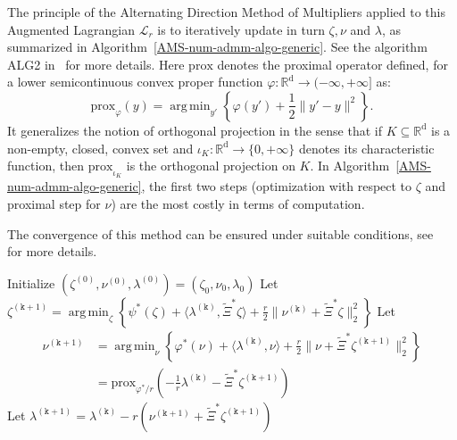 \documentclass{amsproc}
\theoremstyle{definition}
\theoremstyle{remark}
\numberwithin{equation}{section}
\newcommand{\RR}{{\mathbb R}}
\newcommand{\cL}{{\mathcal L}}
\DeclareMathOperator*{\argmin}{arg\,min}
\newcommand{\prox}{\mathrm{prox}}
\begin{document}
The principle of the Alternating Direction Method of Multipliers applied to this Augmented Lagrangian $\cL_r$ is to iteratively update in turn $\zeta, \nu$ and $\lambda$, as summarized in Algorithm~\ref{AMS-num-admm-algo-generic}. See the algorithm ALG2 in~\cite[Chapter 3]{MR724072} for more details. Here $\prox$ denotes the proximal operator defined, for a lower semicontinuous convex proper function $\varphi: \RR^{\mathrm{d}} \to (-\infty, +\infty]$ as:
$$
	\prox_\varphi(y) = \argmin_{y'} \left\{ \varphi(y') + \frac{1}{2} \|y' - y\|^2\right\}.
$$
It generalizes the notion of orthogonal projection in the sense that if $K \subseteq \RR^{\mathrm{d}}$ is a non-empty, closed, convex set and $\iota_K: \RR^{\mathrm{d}} \to \{0,+\infty\}$ denotes its characteristic function, then $\prox_{\iota_K}$ is the orthogonal projection on $K$. In Algorithm~\ref{AMS-num-admm-algo-generic}, the first two steps (optimization with respect to $\zeta$ and proximal step for $\nu$) are the most costly in terms of computation. 

The convergence of this method can be ensured under suitable conditions, see~\cite[Theorem 8]{MR1168183} for more details.

\begin{algorithm}[H]
\DontPrintSemicolon
  
  Initialize $(\zeta^{(0)}, \nu^{(0)}, \lambda^{(0)}) = (\zeta_0, \nu_0, \lambda_0)$ \;
        { 
        Let $\zeta^{(\mathtt{k}+1)} = \argmin_{\zeta}\left\{ \psi^*(\zeta) + \langle \lambda^{(\mathtt{k})} , \widetilde{\Xi}^* \zeta \rangle  + \frac{r}{2} \|\nu^{(\mathtt{k})} + \widetilde{\Xi}^* \zeta \|_2^2 \right\}$\;
        Let 
        \begin{align*}
        \nu^{(\mathtt{k}+1)} 
        &= \argmin_{\nu} \left\{ \varphi^*(\nu)  + \langle \lambda^{(\mathtt{k})} , \nu  \rangle  + \frac{r}{2} \|\nu + \widetilde{\Xi}^* \zeta^{(\mathtt{k}+1)} \|_2^2 \right\} 
        \\
        &= \prox_{\varphi^*/r}\left( - \frac{1}{r}\lambda^{(\mathtt{k})} - \widetilde{\Xi}^* \zeta^{(\mathtt{k}+1)} \right)
	\end{align*} \;
	Let $\lambda^{(\mathtt{k}+1)} = \lambda^{(\mathtt{k})} - r (\nu^{(\mathtt{k}+1)} +\widetilde{\Xi}^* \zeta^{(\mathtt{k}+1)} )$\;
	}
\caption{Alternating Direction Method of Multipliers  \label{AMS-num-admm-algo-generic}}
\end{algorithm}
\end{document}
